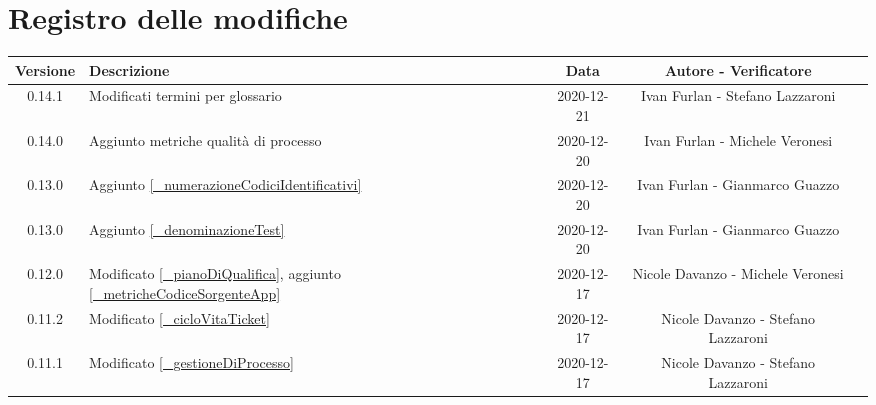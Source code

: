 \section*{Registro delle modifiche}

\begin{center}
	\begin{longtable}{|c|p{5cm}|c|c|c|}
		\hline
		\rowcolor{lighter-grayer}
		\textbf{Versione} & \textbf{Descrizione} & \textbf{Data} & \textbf{Autore - Verificatore} \\
		\hline
		\endfirsthead

		0.14.1 & Modificati termini per glossario & 2020-12-21 & Ivan Furlan - Stefano Lazzaroni \\
		0.14.0 & Aggiunto metriche qualità di processo & 2020-12-20 & Ivan Furlan - Michele Veronesi \\
		0.13.0 & Aggiunto \ref{_numerazioneCodiciIdentificativi} & 2020-12-20 & Ivan Furlan - Gianmarco Guazzo \\
		0.13.0 & Aggiunto \ref{_denominazioneTest} & 2020-12-20 & Ivan Furlan - Gianmarco Guazzo  \\
		0.12.0 & Modificato \ref{_pianoDiQualifica}, aggiunto \ref{_metricheCodiceSorgenteApp} & 2020-12-17 & Nicole Davanzo - Michele Veronesi  \\
		
		0.11.2 & Modificato \ref{_cicloVitaTicket} & 2020-12-17& Nicole Davanzo - Stefano Lazzaroni  \\
		0.11.1 & Modificato \ref{_gestioneDiProcesso} & 2020-12-17 & Nicole Davanzo - Stefano Lazzaroni  \\


\end{longtable}
\end{center}

